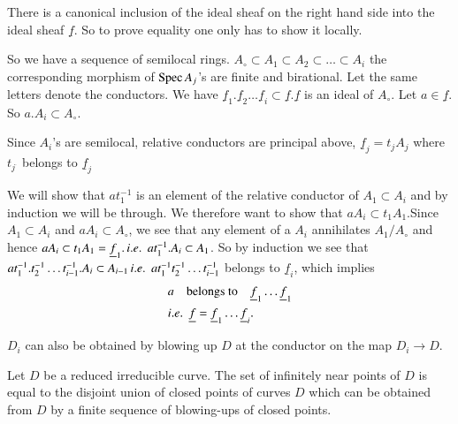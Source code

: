 There is a canonical inclusion of the ideal sheaf on the right hand
side into the ideal sheaf $\underline{f}$. So to prove equality one
only has to show it locally.

So we have a sequence of semilocal rings. $A_\circ\subset A_1\subset
A_2 \subset\ldots\subset A_i$ the corresponding morphism of $\operatorname{Spec}
A_j$'s are finite and birational. Let the same letters denote the
conductors. We have $\underline{f}_1.\underline{f}_2\ldots
\underline{f}_i\subset\underline{f}.\underline{f}$ is an ideal of
$A_\circ$. Let $a\in\underline{f}$. So $a.A_i\subset A_\circ$. 

Since $A_i$'s are semilocal, relative conductors are principal above,
\ie $\underline{f}_j=t_jA_j$ where $t_{j^.}$ belongs to
$\underline{f}_j$

We will show that $at_1^{-1}$ is an element of the relative conductor
of $A_1\subset A_i$ and by induction we will be through. We therefore
want to show that $aA_i\subset t_1A_1$.\pageoriginale Since
$A_1\subset A_i$ and $aA_i\subset A_\circ$, we see that any element of
a $A_i$ annihilates $A_1/{A_\circ}$ and hence $aA_i\subset t_1A_1=
\underline{f}_1.\, {i.e.}\kern.3em\, at_1^{-1}.A_i\subset A_1$. So by induction we see
that $at_1^{-1}.t_2^{-1}\ldots t_{i-1}^{-1}. A_i\subset A_{i-1}\,{i.e.}\kern.3em\,
at_1^{-1} t_2^{-1}\ldots t_{i-1}^{-1}$ belongs to $\underline{f}_i$,
which implies 
\begin{align*}
& a\quad\text{belongs to}\quad\underline{f}_1\ldots\underline{f}_1\\
& {i.e.}\kern.3em\,\underline{f}=\underline{f}_1\ldots\underline{f}_i.
\end{align*}

\begin{REM*}
$D_i$ can also be obtained by blowing up $D$ at the conductor on the
  map $D_i\longrightarrow D$.
\end{REM*}

\begin{def*}
Let $D$ be a reduced irreducible curve. The set of infinitely near
points of $D$ is equal to the disjoint union of closed points of
curves $D$ which can be obtained from $D$ by a finite sequence of
blowing-ups of closed points.
\end{def*}

